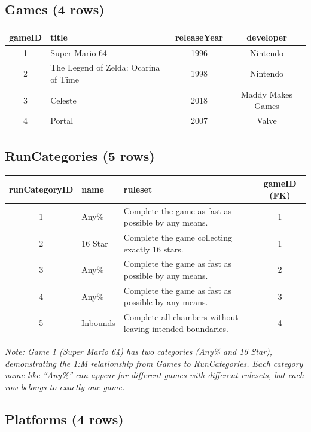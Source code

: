 \documentclass[11pt]{article}
\begin{document}
\subsection*{Games (4 rows)}

\begin{center}
\begin{tabular}{clcc}
\toprule
\textbf{gameID} & \textbf{title} & \textbf{releaseYear} & \textbf{developer} \\
\midrule
1 & Super Mario 64 & 1996 & Nintendo \\
2 & The Legend of Zelda: Ocarina of Time & 1998 & Nintendo \\
3 & Celeste & 2018 & Maddy Makes Games \\
4 & Portal & 2007 & Valve \\
\bottomrule
\end{tabular}
\end{center}

\subsection*{RunCategories (5 rows)}

\begin{center}
\begin{tabular}{clp{5cm}c}
\toprule
\textbf{runCategoryID} & \textbf{name} & \textbf{ruleset} & \textbf{gameID (FK)} \\
\midrule
1 & Any\% & Complete the game as fast as possible by any means. & 1 \\
2 & 16 Star & Complete the game collecting exactly 16 stars. & 1 \\
3 & Any\% & Complete the game as fast as possible by any means. & 2 \\
4 & Any\% & Complete the game as fast as possible by any means. & 3 \\
5 & Inbounds & Complete all chambers without leaving intended boundaries. & 4 \\
\bottomrule
\end{tabular}
\end{center}

\textit{Note: Game 1 (Super Mario 64) has two categories (Any\% and 16 Star), demonstrating the 1:M relationship from Games to RunCategories. Each category name like ``Any\%'' can appear for different games with different rulesets, but each row belongs to exactly one game.}

\subsection*{Platforms (4 rows)}
\end{document}
